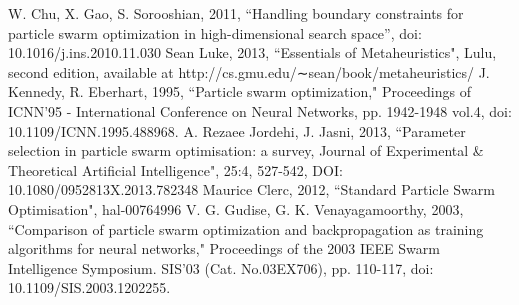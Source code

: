 \documentclass[12pt]{article}
\begin{document}
\vspace{-1.5em}
\begin{thebibliography}{10}

 W. Chu, X. Gao, S. Sorooshian, 2011, ``Handling boundary constraints for particle swarm optimization in high-dimensional search space'', doi: 10.1016/j.ins.2010.11.030
 Sean Luke, 2013, ``Essentials of Metaheuristics", Lulu, second edition, available at http://cs.gmu.edu/∼sean/book/metaheuristics/
 J. Kennedy, R. Eberhart, 1995, ``Particle swarm optimization," Proceedings of ICNN'95 - International Conference on Neural Networks,  pp. 1942-1948 vol.4, doi: 10.1109/ICNN.1995.488968.
 A. Rezaee Jordehi, J. Jasni, 2013, ``Parameter selection in particle swarm optimisation: a survey, Journal of Experimental \& Theoretical Artificial Intelligence", 25:4, 527-542, DOI: 10.1080/0952813X.2013.782348
 Maurice Clerc, 2012, ``Standard Particle Swarm Optimisation", hal-00764996
  V. G. Gudise, G. K. Venayagamoorthy, 2003, ``Comparison of particle swarm optimization and backpropagation as training algorithms for neural networks," Proceedings of the 2003 IEEE Swarm Intelligence Symposium. SIS'03 (Cat. No.03EX706), pp. 110-117, doi: 10.1109/SIS.2003.1202255.


\end{thebibliography}
\end{document}
